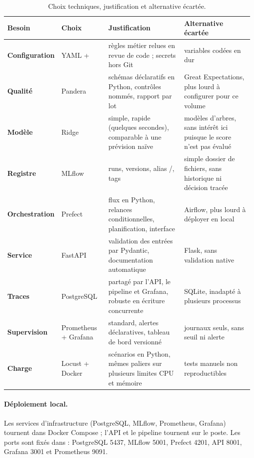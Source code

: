 \documentclass[11pt,a4paper]{article}
\newcommand{\code}[1]{\texttt{\detokenize{#1}}}
\begin{document}
\begin{table}[htbp]\centering\small
\begin{tabularx}{\linewidth}{>{\bfseries}l l X X}
\toprule
Besoin & Choix & Justification & Alternative écartée\\
\midrule
Configuration & YAML + \code{.env} & règles métier relues en revue de code ; secrets hors Git & variables codées en dur\\
Qualité & Pandera & schémas déclaratifs en Python, contrôles nommés, rapport par lot & Great Expectations, plus lourd à configurer pour ce volume\\
Modèle & Ridge & simple, rapide (quelques secondes), comparable à une prévision naïve & modèles d'arbres, sans intérêt ici puisque le score n'est pas évalué\\
Registre & MLflow & runs, versions, alias \code{champion}/\code{challenger}, tags & simple dossier de fichiers, sans historique ni décision tracée\\
Orchestration & Prefect & flux en Python, relances conditionnelles, planification, interface & Airflow, plus lourd à déployer en local\\
Service & FastAPI & validation des entrées par Pydantic, documentation automatique & Flask, sans validation native\\
Traces & PostgreSQL & partagé par l'API, le pipeline et Grafana, robuste en écriture concurrente & SQLite, inadapté à plusieurs processus\\
Supervision & Prometheus + Grafana & standard, alertes déclaratives, tableau de bord versionné & journaux seuls, sans seuil ni alerte\\
Charge & Locust + Docker & scénarios en Python, mêmes paliers sur plusieurs limites CPU et mémoire & tests manuels non reproductibles\\
\bottomrule
\end{tabularx}
\caption{Choix techniques, justification et alternative écartée.}\label{tab:choix}
\end{table}

\paragraph{Déploiement local.} Les services d'infrastructure (PostgreSQL, MLflow,
Prometheus, Grafana) tournent dans Docker Compose ; l'API et le pipeline tournent sur le
poste. Les ports sont fixés dans \code{.env.example} : PostgreSQL 5437, MLflow 5001,
Prefect 4201, API 8001, Grafana 3001 et Prometheus 9091.
\end{document}
